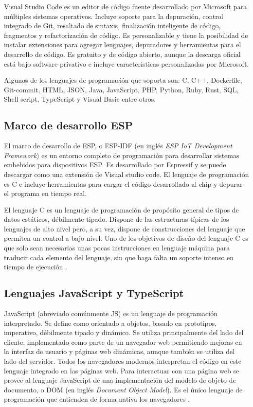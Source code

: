 Visual Studio Code es un editor de código fuente desarrollado por Microsoft para múltiples sistemas operativos. Incluye soporte para la depuración, control integrado de Git, resaltado de sintaxis, finalización inteligente de código, fragmentos y refactorización de código. Es personalizable y tiene la posibilidad de instalar extensiones para agregar lenguajes, depuradores y herramientas para el desarrollo de código. Es gratuito y de código abierto, aunque la descarga oficial está bajo software privativo e incluye características personalizadas por Microsoft.

Algunos de los lenguajes de programación que soporta son: C, C++, Dockerfile, Git-commit, HTML, JSON, Java, JavaScript, PHP, Python, Ruby, Rust, SQL, Shell script, TypeScript y Visual Basic entre otros.

\subsection{Marco de desarrollo ESP}

El marco de desarrollo de ESP, o ESP-IDF (en inglés \textit{ESP IoT Development Framework}) es un entorno completo de programación para desarrollar sistemas embebidos para dispositivos ESP. Es desarrollado por Espressif y se puede descargar como una extensión de Visual studio code. El lenguaje de programación es C e incluye herramientas para cargar el código desarrollado al chip y depurar el programa en tiempo real.

El lenguaje C es un lenguaje de programación de propósito general de tipos de datos estáticos, débilmente tipado. Dispone de las estructuras típicas de los lenguajes de alto nivel pero, a su vez, dispone de construcciones del lenguaje que permiten un control a bajo nivel. Uno de los objetivos de diseño del lenguaje C es que solo sean necesarias unas pocas instrucciones en lenguaje máquina para traducir cada elemento del lenguaje, sin que haga falta un soporte intenso en tiempo de ejecución \citep{15}.

\subsection{Lenguajes JavaScript y TypeScript}

JavaScript (abreviado comúnmente JS) es un lenguaje de programación interpretado. Se define como orientado a objetos, basado en prototipos, imperativo, débilmente tipado y dinámico. Se utiliza principalmente del lado del cliente, implementado como parte de un navegador web permitiendo mejoras en la interfaz de usuario y páginas web dinámicas, aunque también se utiliza del lado del servidor. Todos los navegadores modernos interpretan el código en este lenguaje integrado en las páginas web. Para interactuar con una página web se provee al lenguaje JavaScript de una implementación del modelo de objeto de documento, o DOM (en inglés \textit{Document Object Model}). Es el único lenguaje de programación que entienden de forma nativa los navegadores \citep{16}.


